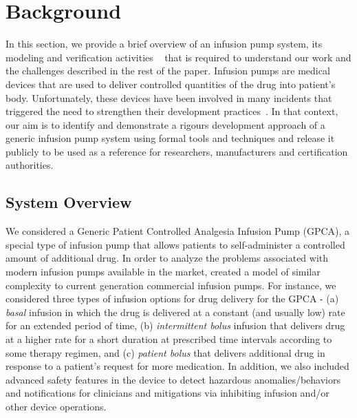 \vspace{-0.1in}\section{Background}
\label{sec:gpca-overview}
\vspace{-0.05in}
In this section, we provide a brief overview of an infusion pump system, its modeling and verification activities ~\cite{hilt2013, req2code} that is required to understand our work and the challenges described in the rest of the paper. Infusion pumps are medical devices that are used to deliver controlled quantities of the drug into patient's body. Unfortunately, these devices have been involved in many incidents that triggered the need to strengthen their development practices~\cite{fda2010whitepaper}. In that context, our aim is to identify and demonstrate a rigours development approach of a generic infusion pump system using formal tools and techniques and release it publicly to be used as a reference for researchers, manufacturers and certification authorities.
\vspace{-0.05in}
\subsection {System Overview}
\vspace{-0.05in}
We considered a Generic Patient Controlled Analgesia Infusion Pump (GPCA), a special type of infusion pump that allows patients to self-administer a controlled amount of additional drug. %
In order to analyze the problems associated with modern infusion pumps available in the market, created a model of similar complexity to current generation commercial infusion pumps. For instance, we considered three types of infusion options for drug delivery for the GPCA - (a) \emph{basal} infusion in which the drug is delivered at a constant (and usually low) rate for an extended period of
time, (b) \emph{intermittent bolus} infusion that delivers drug at a higher rate for a short duration at prescribed time intervals according to some therapy regimen, and (c) \emph{patient bolus} that delivers additional drug in response to a patient's request for more medication. In addition, we also included advanced safety features in the device to detect hazardous anomalies/behaviors and notifications for clinicians and mitigations via inhibiting infusion and/or other device operations.

